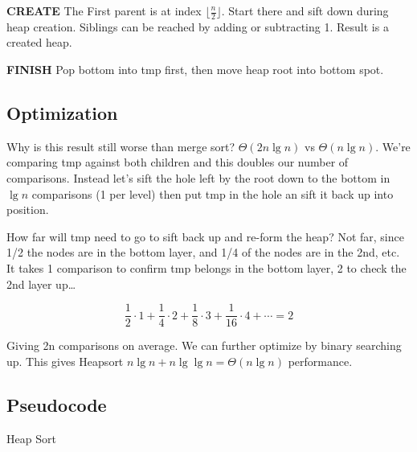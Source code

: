 \documentclass[english, 10pt]{article}
\begin{document}
\textbf{CREATE} The First parent is at index $\lfloor \frac{n}{2} \rfloor$.
Start there and sift down during heap creation. Siblings can be reached by
adding or subtracting 1. Result is a created heap.

\textbf{FINISH} Pop bottom into tmp first, then move heap root into bottom
spot.

\subsection{Optimization}
Why is this result still worse than merge sort? $\Theta(2n\lg n)$ vs
$\Theta(n\lg n)$.  We're comparing tmp against both children and this doubles
our number of comparisons. Instead let's sift the hole left by the root down to
the bottom in $\lg n$ comparisons (1 per level) then put tmp in the hole an sift
it back up into position.

How far will tmp need to go to sift back up and re-form the heap? Not far,
since 1/2 the nodes are in the bottom layer, and 1/4 of the nodes are in the
2nd, etc. It takes 1 comparison to confirm tmp belongs in the bottom layer, 2
to check the 2nd layer up\ldots

$$\frac{1}{2}\cdot1 + \frac{1}{4}\cdot2 + \frac{1}{8}\cdot3 + \frac{1}{16}\cdot4+\cdots = 2$$

Giving 2n comparisons on average. We can further optimize by binary searching
up. This gives Heapsort $ n\lg n + n\lg\lg n= \Theta(n\lg n)$ performance.

\subsection{Pseudocode}
\begin{algorithm}[H]
    \DontPrintSemicolon%

    \caption{Heap Sort}
\end{algorithm}
\end{document}
